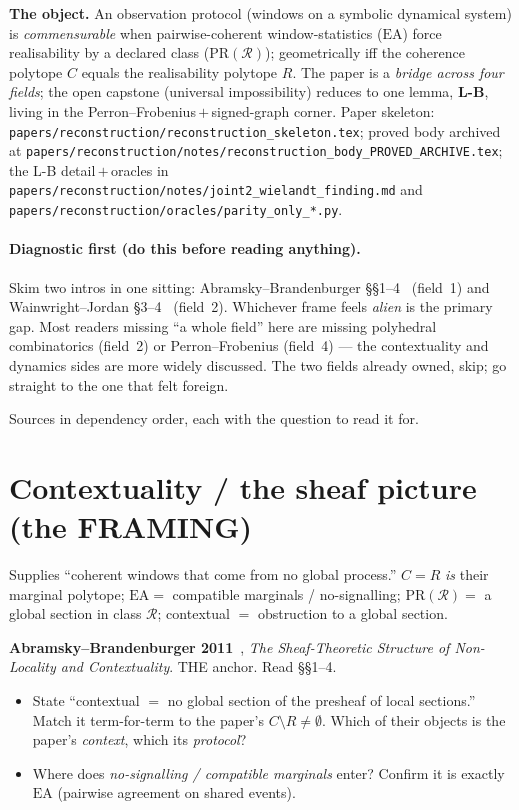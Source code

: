 \noindent\textbf{The object.} An observation protocol (windows on a symbolic
dynamical system) is \emph{commensurable} when pairwise-coherent window-statistics
($\mathrm{EA}$) force realisability by a declared class ($\mathrm{PR}(\mathcal R)$);
geometrically iff the coherence polytope $C$ equals the realisability polytope $R$.
The paper is a \emph{bridge across four fields}; the open capstone (universal
impossibility) reduces to one lemma, \textbf{L-B}, living in the
Perron--Frobenius\,$+$\,signed-graph corner. Paper skeleton:
\texttt{papers/reconstruction/reconstruction\_skeleton.tex}; proved body archived
at \texttt{papers/reconstruction/notes/reconstruction\_body\_PROVED\_ARCHIVE.tex};
the L-B detail\,$+$\,oracles in \texttt{papers/reconstruction/notes/joint2\_wielandt\_finding.md}
and \texttt{papers/reconstruction/oracles/parity\_only\_*.py}.

\paragraph{Diagnostic first (do this before reading anything).}
Skim two intros in one sitting: Abramsky--Brandenburger \S\S1--4~\cite{AB2011}
(field~1) and Wainwright--Jordan \S3--4~\cite{WainwrightJordan2008} (field~2).
Whichever frame feels \emph{alien} is the primary gap. Most readers missing ``a
whole field'' here are missing polyhedral combinatorics (field~2) or
Perron--Frobenius (field~4) --- the contextuality and dynamics sides are more widely
discussed. The two fields already owned, skip; go straight to the one that felt
foreign.

\medskip
Sources in dependency order, each with the question to read it for.

\section{Contextuality / the sheaf picture (the FRAMING)}

Supplies ``coherent windows that come from no global process.'' $C=R$ \emph{is}
their marginal polytope; $\mathrm{EA}=$ compatible marginals / no-signalling;
$\mathrm{PR}(\mathcal R)=$ a global section in class $\mathcal R$; contextual $=$
obstruction to a global section.

\textbf{Abramsky--Brandenburger 2011}~\cite{AB2011}, \emph{The Sheaf-Theoretic
Structure of Non-Locality and Contextuality}. THE anchor. Read \S\S1--4.
\begin{itemize}[itemsep=1pt]
  \item State ``contextual $=$ no global section of the presheaf of local
    sections.'' Match it term-for-term to the paper's $C\setminus R\neq\emptyset$.
    Which of their objects is the paper's \emph{context}, which its \emph{protocol}?
  \item Where does \emph{no-signalling / compatible marginals} enter? Confirm it is
    exactly $\mathrm{EA}$ (pairwise agreement on shared events).
\end{itemize}

